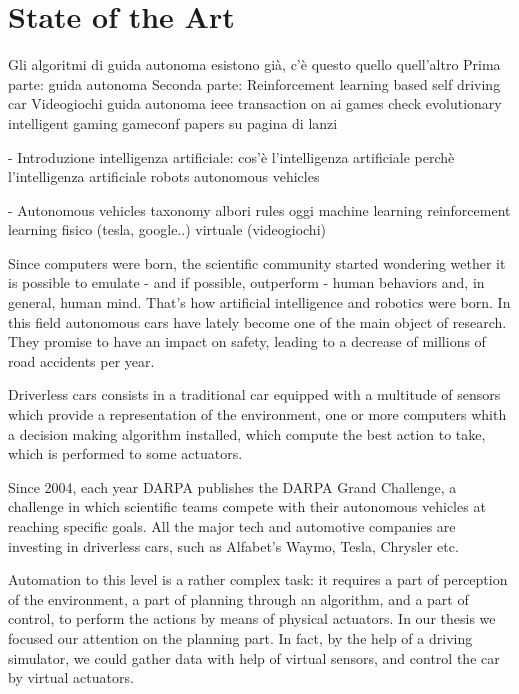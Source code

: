 \chapter{State of the Art}
\label{State of the Art}
\thispagestyle{empty}



Gli algoritmi di guida autonoma esistono già, c'è questo quello quell'altro
	Prima parte: 
		guida autonoma
	Seconda parte:
		Reinforcement learning based self driving car
		Videogiochi guida autonoma
		ieee transaction on ai games
		check evolutionary intelligent gaming
		gameconf
		papers su pagina di lanzi
		
- Introduzione intelligenza artificiale:
	cos'è l'intelligenza artificiale
	perchè l'intelligenza artificiale
	robots
	autonomous vehicles
	
- Autonomous vehicles
	taxonomy
	albori
		rules
	oggi
		machine learning
			reinforcement learning
				fisico (tesla, google..)
				virtuale (videogiochi)
				 
	
	

Since computers were born, the scientific community started wondering wether it is possible to emulate - and if possible, outperform - human behaviors and, in general, human mind. That's how artificial intelligence and robotics were born. In this field autonomous cars have lately become one of the main object of research. They promise to have an impact on safety, leading to a decrease of millions of road accidents per year.

Driverless cars consists in a traditional car equipped with a multitude of sensors which provide a representation of the environment, one or more computers whith a decision making algorithm installed, which compute the best action to take, which is performed to some actuators.

Since 2004, each year DARPA publishes the DARPA Grand Challenge, a challenge in which scientific teams compete with their autonomous vehicles at reaching specific goals.
All the major tech and automotive companies are investing in driverless cars, such as Alfabet's Waymo, Tesla, Chrysler etc.

Automation to this level is a rather complex task: it requires a part of perception of the environment, a part of planning through an algorithm, and a part of control, to perform the actions by means of physical actuators.
In our thesis we focused our attention on the planning part. In fact, by the help of a driving simulator, we could gather data with help of virtual sensors, and control the car by virtual actuators.


